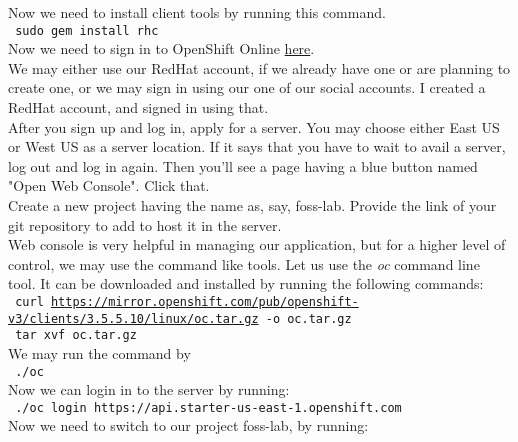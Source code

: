 \documentclass[12pt,a4paper]{article}
\begin{document}
\newline
Now we need to install client tools by running this command.\\
\newline
\texttt{\ sudo gem install rhc}\\
\newline
Now we need to sign in to OpenShift Online \href{https://developers.redhat.com/auth/realms/rhd/protocol/openid-connect/auth?client_id=oso&redirect_uri=https%3A%2F%2Fmanage.openshift.com%2Faccounts%2Fauth%2Fkeycloak%2Fcallback&response_type=code&scope=openid+profile+email&state=9247cc93c4de221ef6029ecb525d6c2f}{here}.\\ We may either use our RedHat account, if we already have one or are planning to create one, or we may sign in using our one of our social accounts. I created a RedHat account, and signed in using that. \\
After you sign up and log in, apply for a server. You may choose either East US or West US as a server location. If it says that you have to wait to avail a server, log out and log in again. Then you'll see a page having a blue button named "Open Web Console". Click that.\\
Create a new project having the name as, say, foss-lab. Provide the link of your git repository to add to host it in the server.\\
Web console is very helpful in managing our application, but for a higher level of control, we may use the command like tools. Let us use the \textit{oc} command line tool. It can be downloaded and installed by running the following commands:\\
\newline
\texttt{\ curl \url{https://mirror.openshift.com/pub/openshift-v3/clients/3.5.5.10/linux/oc.tar.gz} -o oc.tar.gz}\\
\texttt{\ tar xvf oc.tar.gz}\\
\newline
We may run the command by\\
\newline
\texttt{\ ./oc}\\
\newline
Now we can login in to the server by running:\\
\newline
\texttt{\ ./oc login https://api.starter-us-east-1.openshift.com}\\
\newline
Now we need to switch to our project foss-lab, by running:\\
\end{document}

